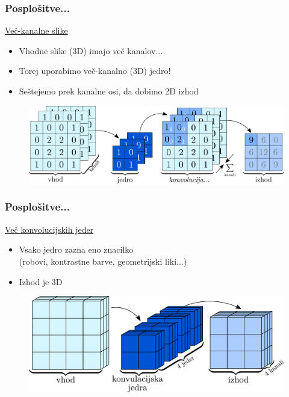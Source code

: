 \documentclass[14pt, t]{beamer}
\begin{document}
\begin{frame}
    \frametitle{Posplošitve...}

    \underline{Več-kanalne slike}
    \begin{itemize}
    
        \item Vhodne slike (3D) imajo več kanalov...

        \item Torej uporabimo več-kanalno (3D) jedro!

        \item Seštejemo prek kanalne osi, da dobimo 2D izhod
    
    \end{itemize}

    \begin{figure}[htb!]
    \centering
    \includegraphics[width=\linewidth]{vector/figures-slo/conv-multi-channel.pdf}
    \end{figure}   

\end{frame}

\begin{frame}
    \frametitle{Posplošitve...}

    \underline{Več konvolucijskih jeder}
    \begin{itemize}
    

        \item Vsako jedro zazna eno znacilko\\
        {\small (robovi, kontrastne barve, geometrijski liki...)}

        \item Izhod je 3D
    
    \end{itemize}

    \begin{figure}[htb!]
    \centering
    \includegraphics[width=\linewidth]{vector/figures-slo/cnn-multi-kernel.pdf}
    \end{figure}   

\end{frame}
\end{document}
